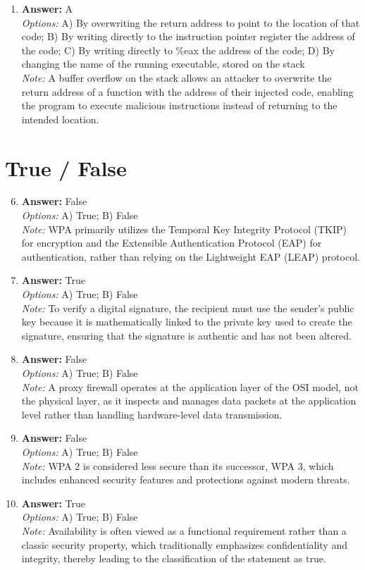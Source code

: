 \documentclass[12pt]{article}
\begin{document}
\begin{enumerate}[label=\arabic*.]
\item \textbf{Answer:} A
\\ \textit{Options:} A) By overwriting the return address to point to the location of that code; B) By writing directly to the instruction pointer register the address of the code; C) By writing directly to \%eax the address of the code; D) By changing the name of the running executable, stored on the stack
\\ \textit{Note:} A buffer overflow on the stack allows an attacker to overwrite the return address of a function with the address of their injected code, enabling the program to execute malicious instructions instead of returning to the intended location.
\end{enumerate}

\section*{True / False}
\begin{enumerate}[label=\arabic*.]
\setcounter{enumi}{5}
\item \textbf{Answer:} False
\\ \textit{Options:} A) True; B) False
\\ \textit{Note:} WPA primarily utilizes the Temporal Key Integrity Protocol (TKIP) for encryption and the Extensible Authentication Protocol (EAP) for authentication, rather than relying on the Lightweight EAP (LEAP) protocol.
\item \textbf{Answer:} True
\\ \textit{Options:} A) True; B) False
\\ \textit{Note:} To verify a digital signature, the recipient must use the sender's public key because it is mathematically linked to the private key used to create the signature, ensuring that the signature is authentic and has not been altered.
\item \textbf{Answer:} False
\\ \textit{Options:} A) True; B) False
\\ \textit{Note:} A proxy firewall operates at the application layer of the OSI model, not the physical layer, as it inspects and manages data packets at the application level rather than handling hardware-level data transmission.
\item \textbf{Answer:} False
\\ \textit{Options:} A) True; B) False
\\ \textit{Note:} WPA 2 is considered less secure than its successor, WPA 3, which includes enhanced security features and protections against modern threats.
\item \textbf{Answer:} True
\\ \textit{Options:} A) True; B) False
\\ \textit{Note:} Availability is often viewed as a functional requirement rather than a classic security property, which traditionally emphasizes confidentiality and integrity, thereby leading to the classification of the statement as true.
\end{enumerate}
\end{document}

